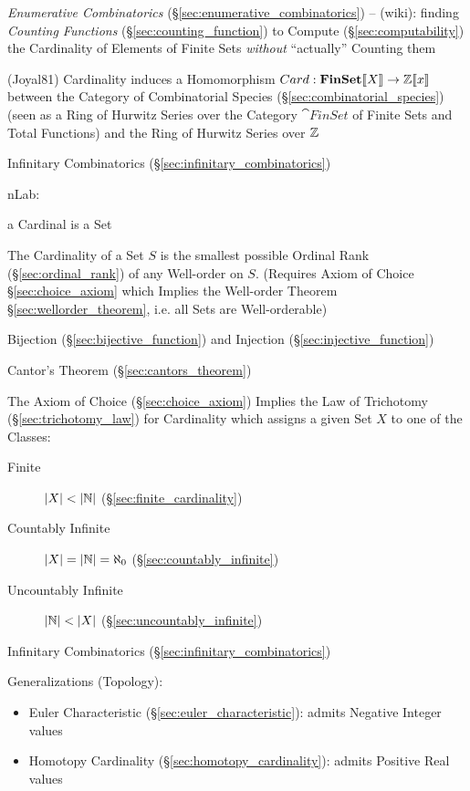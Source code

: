 \fist \emph{Enumerative Combinatorics} (\S\ref{sec:enumerative_combinatorics})
-- (wiki): finding \emph{Counting Functions} (\S\ref{sec:counting_function}) to
Compute (\S\ref{sec:computability}) the Cardinality of Elements of Finite Sets
\emph{without} ``actually'' Counting them

(Joyal81) Cardinality induces a Homomorphism
$Card : \mathbf{FinSet}\llbracket{X}\rrbracket \to \mathbb{Z}\llbracket{x}\rrbracket$
between the Category of Combinatorial Species
(\S\ref{sec:combinatorial_species}) (seen as a Ring of Hurwitz Series over
the Category $\cat{FinSet}$ of Finite Sets and Total Functions) and the Ring
of Hurwitz Series over $\mathbb{Z}$

\fist Infinitary Combinatorics (\S\ref{sec:infinitary_combinatorics})

nLab:

a Cardinal is a Set

The Cardinality of a Set $S$ is the smallest possible Ordinal Rank
(\S\ref{sec:ordinal_rank}) of any Well-order on $S$. (Requires Axiom
of Choice \S\ref{sec:choice_axiom} which Implies the Well-order
Theorem \S\ref{sec:wellorder_theorem}, i.e. all Sets are
Well-orderable)

Bijection (\S\ref{sec:bijective_function}) and Injection
(\S\ref{sec:injective_function})

Cantor's Theorem (\S\ref{sec:cantors_theorem})

The Axiom of Choice (\S\ref{sec:choice_axiom}) Implies the Law of
Trichotomy (\S\ref{sec:trichotomy_law}) for Cardinality which assigns
a given Set $X$ to one of the Classes:

\begin{description}
\item [Finite] $|X| < |\mathbb{N}|$ (\S\ref{sec:finite_cardinality})
\item [Countably Infinite] $|X| = |\mathbb{N}| = \aleph_0$
  (\S\ref{sec:countably_infinite})
\item [Uncountably Infinite] $|\mathbb{N}| < |X|$
  (\S\ref{sec:uncountably_infinite})
\end{description}

Infinitary Combinatorics (\S\ref{sec:infinitary_combinatorics})

\asterism


Generalizations (Topology):

\begin{itemize}
  \item Euler Characteristic (\S\ref{sec:euler_characteristic}):
    admits Negative Integer values
  \item Homotopy Cardinality (\S\ref{sec:homotopy_cardinality}):
    admits Positive Real values
\end{itemize}

